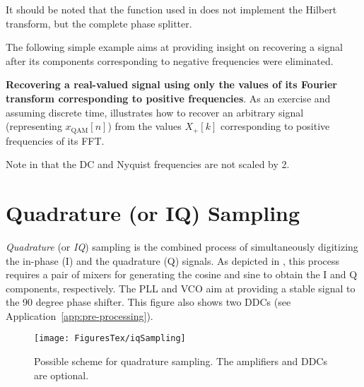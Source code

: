 It should be  noted that the  function used in  does not implement the Hilbert transform, but the complete phase splitter.

The following simple example aims at providing insight on recovering a signal after its
components corresponding to negative frequencies were eliminated.

\bExample \textbf{Recovering a real-valued signal using only the values of its Fourier
transform corresponding to positive frequencies}.
As an exercise and assuming discrete time,  illustrates how to recover an arbitrary signal (representing $x_{\textrm{QAM}}[n]$) from the values $X_{+}[k]$ 
corresponding to positive frequencies of its FFT.


Note in  that the DC and Nyquist frequencies are not scaled by 2.
\eExample

\section{Quadrature (or IQ) Sampling}
\label{sec:iqSampling}

\emph{Quadrature} (or \emph{IQ}) sampling is the combined process of simultaneously digitizing the in-phase (I) and the quadrature (Q) signals. As depicted in , this process requires a pair of mixers for
generating the cosine and sine to obtain the I and Q components, respectively. The PLL and VCO aim at providing a stable signal to the 90 degree phase shifter. This figure
also shows two DDCs (see Application~\ref{app:pre-processing}).

\begin{figure}[htbp]
	\centering
		\texttt{[image: FiguresTex/iqSampling]}		
	\caption{Possible scheme for quadrature sampling. The amplifiers and DDCs are optional.\label{fig:iqSampling}}
\end{figure}

